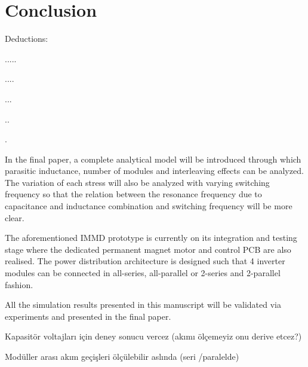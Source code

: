 \section{Conclusion}

Deductions:

.....

....

...

..

.

In the final paper, a complete analytical model will be introduced through which parasitic inductance, number of modules and interleaving effects can be analyzed. The variation of each stress will also be analyzed with varying switching frequency so that the relation between the resonance frequency due to capacitance and inductance combination and switching frequency will be more clear. 

The aforementioned IMMD prototype is currently on its integration and testing stage where the dedicated permanent magnet motor and control PCB are also realised. The power distribution architecture is designed such that 4 inverter modules can be connected in all-series, all-parallel or 2-series and 2-parallel fashion.

All the simulation results presented in this manuscript will be validated via experiments and presented in the final paper.

Kapasitör voltajları için deney sonucu vercez (akımı ölçemeyiz onu derive etcez?)

Modüller arası akım geçişleri ölçülebilir aslında (seri
/paralelde)

